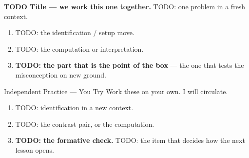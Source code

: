\vspace{0.10in}

\boxguard[20]
\begin{practicebox}
\small
\textbf{TODO Title --- we work this one together.} TODO: one problem in a fresh context.

\begin{enumerate}[label=\textbf{\alph*.}, leftmargin=1.8em, itemsep=7pt]
  \item TODO: the identification / setup move. \blank{4.0cm}
  \item TODO: the computation or interpretation.\\[3pt]
  \item \textbf{TODO: the part that is the point of the box} --- the one that tests the
        misconception on new ground.\\[3pt]
\end{enumerate}
\end{practicebox}

\vspace{0.10in}

\boxguard[20]
\begin{notesbox}{Independent Practice --- You Try}
\small
Work these on your own. I will circulate.

\begin{enumerate}[leftmargin=1.9em, itemsep=8pt]
  \item TODO: identification in a new context. \blank{4.0cm}
  \item TODO: the contrast pair, or the computation.\\[3pt]
  \item \textbf{TODO: the formative check.} TODO: the item that decides how the next lesson
        opens.\\[3pt]
\end{enumerate}
\end{notesbox}


